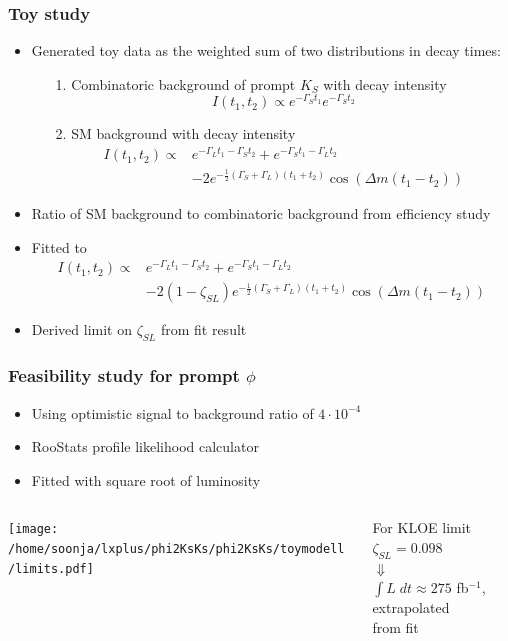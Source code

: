 \documentclass{beamer}
\begin{document}
\begin{frame}
\frametitle{Toy study}
\begin{itemize}
\item Generated toy data as the weighted sum of two distributions in decay times:
\begin{itemize}
\item[1.] Combinatoric background of prompt $K_S$ with decay intensity
\begin{equation*}
I(t_1,t_2) \propto e^{-\Gamma_S t_1}e^{-\Gamma_S t_2}  
\end{equation*}
\item[2.] SM background with decay intensity
\begin{align*}
I(t_1,t_2) \propto & e^{-\Gamma_L t_1 - \Gamma_S t_2} +e^{-\Gamma_S t_1 - \Gamma_L t_2}\\& - 2 e^{-\frac{1}{2}\left(\Gamma_S + \Gamma_L\right)\left(t_1+t_2\right)}\cos\left(\Delta m \left(t_1-t_2\right)\right)
\end{align*}
\end{itemize}
\item Ratio of SM background to combinatoric background from efficiency study
\item Fitted to 
\begin{align*}
I(t_1,t_2) \propto & e^{-\Gamma_L t_1 - \Gamma_S t_2} +e^{-\Gamma_S t_1 - \Gamma_L t_2}\\& - 2(1-\zeta_{SL}) e^{-\frac{1}{2}\left(\Gamma_S + \Gamma_L\right)\left(t_1+t_2\right)}\cos\left(\Delta m \left(t_1-t_2\right)\right)
\end{align*}
\item Derived limit on $\zeta_{SL}$ from fit result 
\end{itemize}
\end{frame}


\begin{frame}
\frametitle{Feasibility study for prompt $\phi$}
\begin{itemize}
\item Using optimistic signal to background ratio of $4\cdot 10^{-4}$
\item RooStats profile likelihood calculator
\item Fitted with square root of luminosity
\end{itemize}

\begin{columns}
\begin{column}{.7\columnwidth}
\vspace*{-.3cm}
\begin{center}
\texttt{[image: /home/soonja/lxplus/phi2KsKs/phi2KsKs/toymodell/limits.pdf]}

\end{center}
\end{column}
\begin{column}{.29\columnwidth}\centering
For KLOE limit $\zeta_{SL} = 0.098$\\
$\Downarrow$\\
$\int L \;dt \approx 275$ fb$^{-1}$,
extrapolated\\ from fit
\end{column}
\end{columns}
\end{frame}
\end{document}
